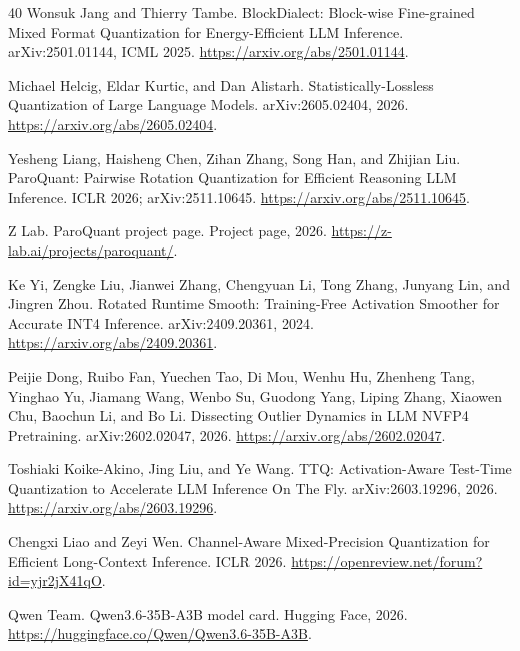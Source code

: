 \documentclass{article}
\begin{document}
\begin{thebibliography}{40}
Wonsuk Jang and Thierry Tambe.
\newblock BlockDialect: Block-wise Fine-grained Mixed Format Quantization for
Energy-Efficient LLM Inference.
\newblock arXiv:2501.01144, ICML 2025.
\newblock \url{https://arxiv.org/abs/2501.01144}.

Michael Helcig, Eldar Kurtic, and Dan Alistarh.
\newblock Statistically-Lossless Quantization of Large Language Models.
\newblock arXiv:2605.02404, 2026.
\newblock \url{https://arxiv.org/abs/2605.02404}.

Yesheng Liang, Haisheng Chen, Zihan Zhang, Song Han, and Zhijian Liu.
\newblock ParoQuant: Pairwise Rotation Quantization for Efficient Reasoning
LLM Inference.
\newblock ICLR 2026; arXiv:2511.10645.
\newblock \url{https://arxiv.org/abs/2511.10645}.

Z Lab.
\newblock ParoQuant project page.
\newblock Project page, 2026.
\newblock \url{https://z-lab.ai/projects/paroquant/}.

Ke Yi, Zengke Liu, Jianwei Zhang, Chengyuan Li, Tong Zhang, Junyang Lin, and
Jingren Zhou.
\newblock Rotated Runtime Smooth: Training-Free Activation Smoother for
Accurate INT4 Inference.
\newblock arXiv:2409.20361, 2024.
\newblock \url{https://arxiv.org/abs/2409.20361}.

Peijie Dong, Ruibo Fan, Yuechen Tao, Di Mou, Wenhu Hu, Zhenheng Tang,
Yinghao Yu, Jiamang Wang, Wenbo Su, Guodong Yang, Liping Zhang, Xiaowen Chu,
Baochun Li, and Bo Li.
\newblock Dissecting Outlier Dynamics in LLM NVFP4 Pretraining.
\newblock arXiv:2602.02047, 2026.
\newblock \url{https://arxiv.org/abs/2602.02047}.

Toshiaki Koike-Akino, Jing Liu, and Ye Wang.
\newblock TTQ: Activation-Aware Test-Time Quantization to Accelerate LLM
Inference On The Fly.
\newblock arXiv:2603.19296, 2026.
\newblock \url{https://arxiv.org/abs/2603.19296}.

Chengxi Liao and Zeyi Wen.
\newblock Channel-Aware Mixed-Precision Quantization for Efficient
Long-Context Inference.
\newblock ICLR 2026.
\newblock \url{https://openreview.net/forum?id=yjr2jX41qO}.

Qwen Team.
\newblock Qwen3.6-35B-A3B model card.
\newblock Hugging Face, 2026.
\newblock \url{https://huggingface.co/Qwen/Qwen3.6-35B-A3B}.


\end{thebibliography}
\end{document}
